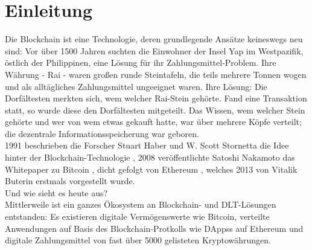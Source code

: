 \chapter{Einleitung}
\label{ch:intro}
Die Blockchain ist eine Technologie, deren grundlegende Ansätze keineswegs neu sind: Vor über 1500 Jahren suchten die Einwohner der Insel Yap im Westpazifik, östlich der Philippinen, eine Lösung für ihr Zahlungsmittel-Problem. Ihre Währung - Rai - waren großen runde Steintafeln, die teils mehrere Tonnen wogen und als alltägliches Zahlungsmittel ungeeignet waren. Ihre Lösung: Die Dorfältesten merkten sich, wem welcher Rai-Stein gehörte. Fand eine Transaktion statt, so wurde diese den Dorfältesten mitgeteilt. Das Wissen, wem welcher Stein gehörte und wer von wem etwas gekauft hatte, war über mehrere Köpfe verteilt; die dezentrale Informationsspeicherung war geboren. \cite{forbes2018}\\
1991 beschrieben die Forscher Stuart Haber und W. Scott Stornetta die Idee hinter der Blockchain-Technologie \cite{binance2019}, 2008 veröffentlichte Satoshi Nakamoto das Whitepaper zu Bitcoin \cite{nakamoto2009}, dicht gefolgt von Ethereum \cite{buterin2013}, welches 2013 von Vitalik Buterin erstmals vorgestellt wurde.\\
Und wie sieht es heute aus?\\
Mittlerweile ist ein ganzes Ökosystem an Block\-chain- und \ac{DLT}-Lösungen entstanden: Es existieren digitale Vermögenswerte wie Bitcoin, verteilte Anwendungen auf Basis des Blockchain-Protkolls wie \acp{DApp}s auf Ethereum und digitale Zahlungsmittel von fast über 5000 gelisteten Kryptowährungen.\\


%
%
